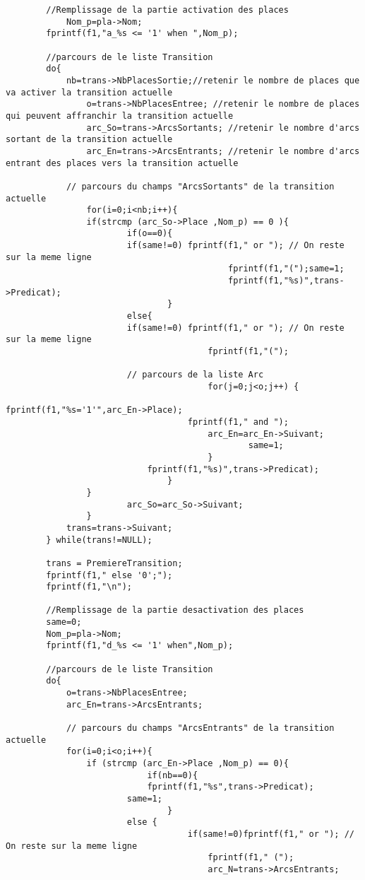 \begin{appendices}
\begin{lstlisting}
		//Remplissage de la partie activation des places 
        	Nom_p=pla->Nom;	
		fprintf(f1,"a_%s <= '1' when ",Nom_p);	

		//parcours de le liste Transition
 		do{
			nb=trans->NbPlacesSortie;//retenir le nombre de places que va activer la transition actuelle 
    			o=trans->NbPlacesEntree; //retenir le nombre de places qui peuvent affranchir la transition actuelle 
    			arc_So=trans->ArcsSortants; //retenir le nombre d'arcs sortant de la transition actuelle 
    			arc_En=trans->ArcsEntrants; //retenir le nombre d'arcs entrant des places vers la transition actuelle 
				
			// parcours du champs "ArcsSortants" de la transition actuelle
        	  	for(i=0;i<nb;i++){ 
				if(strcmp (arc_So->Place ,Nom_p) == 0 ){
			      		if(o==0){
						if(same!=0) fprintf(f1," or "); // On reste sur la meme ligne 
        	                              	fprintf(f1,"(");same=1;
        	                              	fprintf(f1,"%s)",trans->Predicat);
        	             		}
				        else{ 
						if(same!=0) fprintf(f1," or "); // On reste sur la meme ligne 
        	                        	fprintf(f1,"(");
						
						// parcours de la liste Arc
        	                        	for(j=0;j<o;j++) {
        	                          		fprintf(f1,"%s='1'",arc_En->Place);
				            		fprintf(f1," and ");
			                    		arc_En=arc_En->Suivant; 
        	                            		same=1;
        	                       	 	}
				        	fprintf(f1,"%s)",trans->Predicat);
        	              		} 			
			   	}
        	    		arc_So=arc_So->Suivant; 	     	
        	 	} 
 			trans=trans->Suivant;
 		} while(trans!=NULL);

 		trans = PremiereTransition;
		fprintf(f1," else '0';");
		fprintf(f1,"\n"); 

		//Remplissage de la partie desactivation des places 		
		same=0; 
		Nom_p=pla->Nom;	
		fprintf(f1,"d_%s <= '1' when",Nom_p);
		
		//parcours de le liste Transition
		do{ 
 			o=trans->NbPlacesEntree;
 			arc_En=trans->ArcsEntrants;
		
			// parcours du champs "ArcsEntrants" de la transition actuelle
 			for(i=0;i<o;i++){
				if (strcmp (arc_En->Place ,Nom_p) == 0){
        	        		if(nb==0){ 	
			        		fprintf(f1,"%s",trans->Predicat);
						same=1;
        	                	}
			        	else {
        	               			if(same!=0)fprintf(f1," or "); // On reste sur la meme ligne
        	                     		fprintf(f1," (");
        	     	             		arc_N=trans->ArcsEntrants;
			

\end{lstlisting}
\end{appendices}
